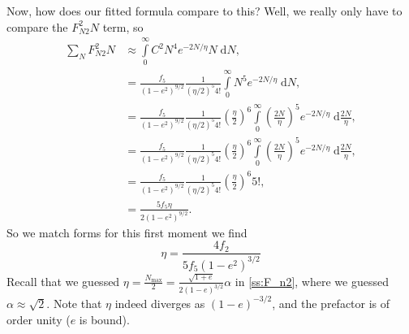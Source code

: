 \documentclass[11pt,
        usenames, %
        dvipsnames %
    ]{article}
\newcommand*{\p}[1]{\left(#1\right)}
\begin{document}
Now, how does our fitted formula compare to this? Well, we really only have to
compare the $F_{N2}^2N$ term, so
\begin{align}
    \sum\limits_{N}F_{N2}^2N &\approx \int\limits_0^\infty
            C^2 N^4 e^{-2N/\eta}N\;\mathrm{d}N,\\
        &= \frac{f_5}{\p{1 - e^2}^{9/2}}
                \frac{1}{\p{\eta / 2}^5 4!}
            \int\limits_0^\infty N^5 e^{-2N/\eta}\;\mathrm{d}N,\\
        &= \frac{f_5}{\p{1 - e^2}^{9/2}}
                \frac{1}{\p{\eta / 2}^5 4!}
            \p{\frac{\eta}{2}}^6
            \int\limits_0^\infty \p{\frac{2N}{\eta}}^5
                e^{-2N/\eta}\;\mathrm{d}\frac{2N}{\eta},\\
        &= \frac{f_5}{\p{1 - e^2}^{9/2}}
                \frac{1}{\p{\eta / 2}^5 4!}
            \p{\frac{\eta}{2}}^6
            \int\limits_0^\infty \p{\frac{2N}{\eta}}^5
                e^{-2N/\eta}\;\mathrm{d}\frac{2N}{\eta},\\
        &= \frac{f_5}{\p{1 - e^2}^{9/2}}
                \frac{1}{\p{\eta / 2}^5 4!}
            \p{\frac{\eta}{2}}^6 5!,\\
        &= \frac{5f_5 \eta}{2\p{1 - e^2}^{9/2}}.
\end{align}
So we match forms for this first moment we find
\begin{equation}
    \eta = \frac{4f_2}{5f_5\p{1 - e^2}^{3/2}}
\end{equation}
Recall that we guessed $\eta = \frac{N_{\max}}{2} = \frac{\sqrt{1 + e}}{2\p{1 -
e}^{3/2}}\alpha$ in \autoref{ss:F_n2}, where we guessed $\alpha \approx
\sqrt{2}$. Note that $\eta$ indeed diverges as $(1 - e)^{-3/2}$, and the
prefactor is of order unity ($e$ is bound).

\end{document}
